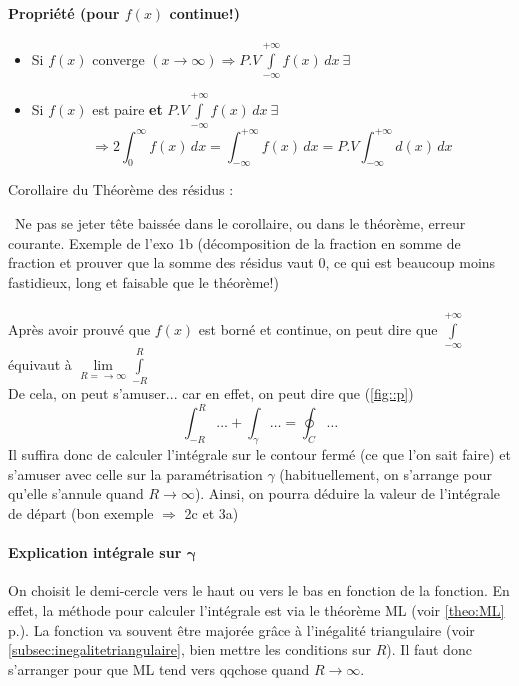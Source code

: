 \paragraph{Propriété (pour $f(x)$ continue!)} \begin{itemize}
\item Si $f(x)$ converge $(x\rightarrow\infty)\Rightarrow P.V\displaystyle\int\limits_{-\infty}^{+\infty}f(x)\,dx\ \exists$
\item Si $f(x)$ est paire \textbf{et} $P.V\displaystyle\int\limits_{-\infty}^{+\infty}f(x)\,dx\ \exists$ $$\Rightarrow 2\int_0^{\infty}f(x)\,dx=\int_{-\infty}^{+\infty}f(x)\,dx=P.V\int_{-\infty}^{+\infty}d(x)\,dx$$
\end{itemize}
Corollaire du Théorème des résidus : \begin{center}
\end{center}
\danger\ Ne pas se jeter tête baissée dans le corollaire, ou dans le théorème, erreur courante. Exemple de l'exo 1b (décomposition de la fraction en somme de fraction et prouver que la somme des résidus vaut 0, ce qui est beaucoup moins fastidieux, long et faisable que le théorème!)\\\\ 

Après avoir prouvé que $f(x)$ est borné et continue, on peut dire que $\displaystyle\int\limits_{-\infty}^{+\infty}$ équivaut à $\lim\limits_{R=\rightarrow\infty}\displaystyle\int\limits_{-R}^R$\\ 
De cela, on peut s'amuser... car en effet, on peut dire que (\autoref{fig::p}) $$\int_{-R}^R\dots+\int_{\gamma}\dots=\oint_C\dots$$ Il suffira donc de calculer l'intégrale sur le contour fermé (ce que l'on sait faire) et s'amuser avec celle sur la paramétrisation $\gamma$ (habituellement, on s'arrange pour qu'elle s'annule quand $R\rightarrow\infty$). Ainsi, on pourra déduire la valeur de l'intégrale de départ (bon exemple $\Rightarrow$ 2c et 3a)
\paragraph{Explication intégrale sur $\boldsymbol{\gamma}$}
On choisit le demi-cercle vers le haut ou vers le bas en fonction de la fonction. En effet, la méthode pour calculer l'intégrale est via le théorème ML (voir \autoref{theo:ML} p.\pageref{theo:ML}). La fonction va souvent être majorée grâce à l'inégalité triangulaire (voir \autoref{subsec:inegalitetriangulaire}, bien mettre les conditions sur $R$). Il faut donc s'arranger pour que ML tend vers qqchose quand $R\rightarrow\infty$.
